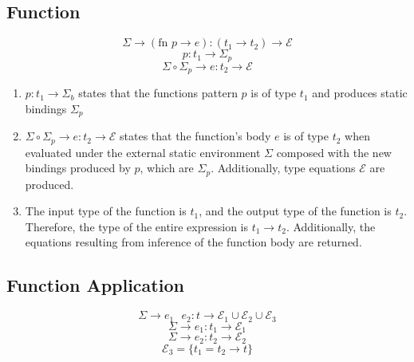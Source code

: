 \documentclass[titlepage]{article}
\begin{document}
\subsection{Function}

$$\Sigma \rightarrow (\text{fn } p \rightarrow e) : (t_1 \rightarrow t_2) \rightarrow \mathcal{E}$$
\noindent\makebox[\linewidth]{\rule{2.25in}{0.4pt}}
$$p : t_1 \rightarrow \Sigma_p$$
$$\Sigma \circ \Sigma_p \rightarrow e : t_2 \rightarrow \mathcal{E}$$

\begin{enumerate}
\item $p : t_1 \rightarrow \Sigma_b$ states that the functions pattern $p$ is of type $t_1$ and produces static bindings $\Sigma_p$
\item $\Sigma \circ \Sigma_p \rightarrow e : t_2 \rightarrow \mathcal{E}$ states that the function's body $e$ is of type $t_2$ when evaluated under the external static environment $\Sigma$ composed with the new bindings produced by $p$, which are $\Sigma_p$. Additionally, type equations $\mathcal{E}$ are produced.
\item The input type of the function is $t_1$, and the output type of the function is $t_2$. Therefore, the type of the entire expression is $t_1 \rightarrow t_2$. Additionally, the equations resulting from inference of the function body are returned.
\end{enumerate}

\subsection{Function Application}

$$\Sigma \rightarrow e_1 \text{ } e_2 : t \rightarrow \mathcal{E}_1 \cup \mathcal{E}_2 \cup \mathcal{E}_3$$
\noindent\makebox[\linewidth]{\rule{2in}{0.4pt}}
$$\Sigma \rightarrow e_1 : t_1 \rightarrow \mathcal{E}_1$$
$$\Sigma \rightarrow e_2 : t_2 \rightarrow \mathcal{E}_2$$
$$\mathcal{E}_3 = \{t_1 = t_2 \rightarrow t\}$$
\end{document}
